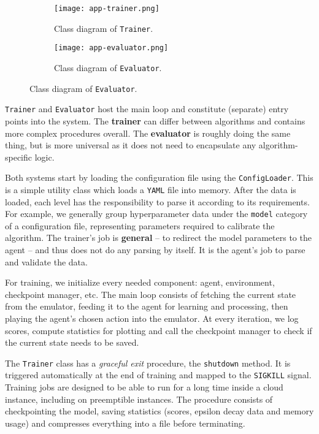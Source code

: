\begin{figure}[ht]
    \centering
    \begin{subfigure}[b]{0.5\textwidth}
        \centering
        \texttt{[image: app-trainer.png]}
        \caption{Class diagram of \texttt{Trainer}.}
        \label{fig:trainer-diagram}
    \end{subfigure}%
    \hfill
    \begin{subfigure}[b]{0.5\textwidth}
        \centering
        \texttt{[image: app-evaluator.png]}
        \caption{Class diagram of \texttt{Evaluator}.}
        \label{fig:evaluator-diagram}
    \end{subfigure}
\end{figure}

\texttt{Trainer} and \texttt{Evaluator} host the main loop and constitute (separate) entry points into the system.
The \textbf{trainer} can differ between algorithms and contains more complex procedures overall.
The \textbf{evaluator} is roughly doing the same thing, but is more universal as it does not need to encapsulate any algorithm-specific logic.

Both systems start by loading the configuration file using the \texttt{ConfigLoader}.
This is a simple utility class which loads a \texttt{YAML} file into memory.
After the data is loaded, each level has the responsibility to parse it according to its requirements.
For example, we generally group hyperparameter data under the \texttt{model} category of a configuration file, representing parameters required to calibrate the algorithm.
The trainer's job is \textbf{general} -- to redirect the model parameters to the agent -- and thus does not do any parsing by itself.
It is the agent’s job to parse and validate the data.

For training, we initialize every needed component: agent, environment, checkpoint manager, etc.
The main loop consists of fetching the current state from the emulator, feeding it to the agent for learning and processing, then playing the agent’s chosen action into the emulator.
At every iteration, we log scores, compute statistics for plotting and call the checkpoint manager to check if the current state needs to be saved.

The \texttt{Trainer} class has a \emph{graceful exit} procedure, the \texttt{shutdown} method.
It is triggered automatically at the end of training and mapped to the \texttt{SIGKILL} signal.
Training jobs are designed to be able to run for a long time inside a cloud instance, including on preemptible instances\footnotemark{}.
The procedure consists of checkpointing the model, saving statistics (scores, epsilon decay data and memory usage) and compresses everything into a file before terminating.

